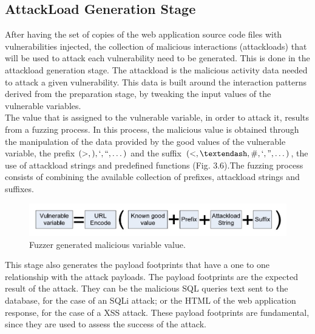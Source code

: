 \subsection{AttackLoad Generation Stage}
After having the set of copies of the web application
source code files with vulnerabilities injected, the collection of malicious interactions (attackloads) that will be used to attack each vulnerability need to be generated. This
is done in the attackload generation stage. The attackload
is the malicious activity data needed to attack a given vulnerability. This data is built around the interaction patterns derived from the preparation stage, by tweaking
the input values of the vulnerable variables.\\
\newline
The value that is assigned to the vulnerable variable, in
order to attack it, results from a fuzzing process. In this
process, the malicious value is obtained through the
manipulation of the data provided by the good values of
the vulnerable variable, the prefix $ (>,),`,``, \dots) $ and the suffix $ (<,–,\#,`,",\dots) $, the use of attackload strings and predefined functions (Fig. 3.6).The fuzzing process consists of combining the available collection of prefixes, attackload strings and suffixes.\\
\newline
\begin{figure}[H]
\centering
\includegraphics[width=0.7\linewidth]{Main/Fig6}
\caption{Fuzzer generated malicious variable value.}
\label{fig:Fig6}
\end{figure}
This stage also generates the payload footprints that
have a one to one relationship with the attack payloads.
The payload footprints are the expected result of the
attack. They can be the malicious SQL queries text sent to
the database, for the case of an SQLi attack; or the HTML
of the web application response, for the case of a XSS
attack. These payload footprints are fundamental, since
they are used to assess the success of the attack.

